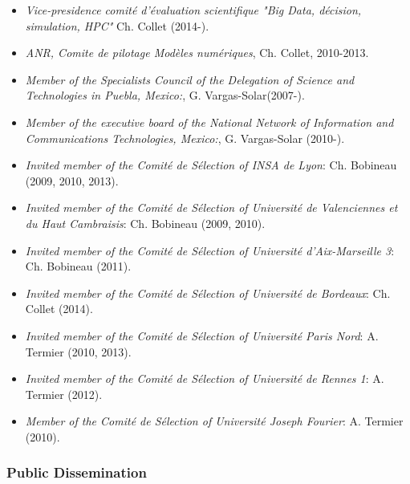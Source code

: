 \begin{itemize}
\setlength{\itemindent}{-0.5cm}
\setlength{\itemsep}{-0.1cm}

\item {\it Vice-presidence  comit{\'e} d'{\'e}valuation scientifique  "Big Data, d{\'e}cision, simulation, HPC"}   Ch. Collet (2014-).

\item {\it ANR, Comite  de pilotage Mod{\`e}les num{\'e}riques}, Ch. Collet, 2010-2013.

\item {\it Member of the Specialists Council of the Delegation of Science and Technologies in Puebla, Mexico:}, G. Vargas-Solar(2007-).

\item {\it Member of the executive board of the National Network of Information and Communications Technologies, Mexico:}, G. Vargas-Solar (2010-).

\item {\it Invited member of the Comit{\'e} de S{\'e}lection of INSA de Lyon}: Ch. Bobineau (2009, 2010, 2013).

\item {\it Invited member of the Comit{\'e} de S{\'e}lection of Universit{\'e} de Valenciennes et du Haut Cambraisis}: Ch. Bobineau (2009, 2010).

\item {\it Invited member of the Comit{\'e} de S\'election of Universit{\'e} d'Aix-Marseille 3}: Ch. Bobineau (2011).

\item {\it Invited member of the Comit{\'e} de S\'election of Universit{\'e} de Bordeaux}: Ch. Collet (2014).

\item {\it Invited member of the Comit\'e de S\'election of Universit\'e Paris Nord}: A. Termier (2010, 2013).

\item {\it Invited member of the Comit\'e de S\'election of Universit\'e de Rennes 1}: A. Termier (2012).

\item {\it Member of the Comit\'e de S\'election of Universit\'e Joseph Fourier}: A. Termier (2010).

\end{itemize}



\subsubsection{Public Dissemination}

